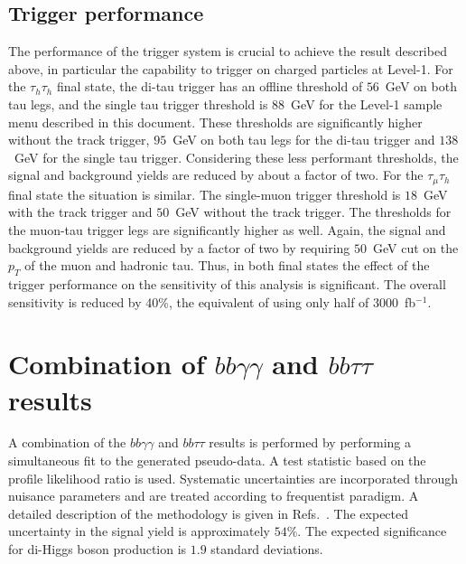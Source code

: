 \subsection{Trigger performance}
The performance of the trigger system is crucial to achieve the result
described above, in particular the capability to trigger on charged
particles at Level-1. For the $\tau_{h}\tau_{h}$ final state, the
di-tau trigger has an offline threshold of $56$~GeV on both tau legs,
and the single tau trigger threshold is $88$~GeV for the Level-1 sample menu
described in this document. These thresholds are significantly higher
without the track trigger, $95$~GeV on both tau legs for the di-tau
trigger and $138$~GeV for the single tau trigger. Considering these less
performant thresholds, the signal and background yields are reduced by about a factor of
two. For the $\tau_{\mu}\tau_{h}$ final state the situation is similar. The single-muon trigger
threshold is $18$~GeV with the track trigger and $50$~GeV without the track
trigger. The thresholds for the muon-tau trigger legs are significantly
higher as well. Again, the signal and background yields are reduced by a factor of two
by requiring $50$~GeV cut on the $p_T$ of the muon and hadronic tau.
Thus, in both final states the effect of the trigger performance on the sensitivity of this analysis is significant. The overall sensitivity is
reduced by 40\%, the equivalent of  using only half of 3000~fb$^{-1}$.

\section{Combination of $bb\gamma\gamma$ and $bb\tau\tau$ results}
A combination of the  $bb\gamma\gamma$ and $bb\tau\tau$ results is performed by performing a simultaneous fit to the generated pseudo-data. A test statistic based on the profile likelihood ratio is used. Systematic uncertainties are incorporated through nuisance parameters and are treated according to frequentist paradigm. A detailed description of the methodology is given in Refs.~\cite{CMS-NOTE-2011-005,Chatrchyan201226}. The expected uncertainty in the signal yield is approximately $54\%$. The expected significance for di-Higgs boson production is $1.9$ standard deviations.  

